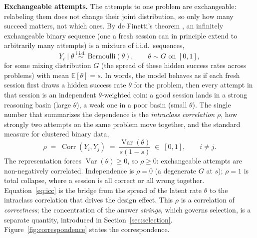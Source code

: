 \documentclass[11pt]{article}
\newcommand{\E}{\mathbb{E}}
\newcommand{\Var}{\operatorname{Var}}
\newcommand{\Corr}{\operatorname{Corr}}
\begin{document}
\textbf{Exchangeable attempts.} The attempts to one problem are exchangeable: relabeling them does not change their joint distribution, so only how many succeed matters, not which ones. By de Finetti's theorem \citep{definetti1937prevision}, an infinitely exchangeable binary sequence (one a fresh session can in principle extend to arbitrarily many attempts) is a mixture of i.i.d.\ sequences,
\begin{equation}
Y_i \mid \theta \;\overset{\text{i.i.d.}}{\sim}\; \text{Bernoulli}(\theta),
\qquad
\theta \sim G \text{ on } [0,1],
\label{eq:definetti}
\end{equation}
for some mixing distribution $G$ (the spread of these hidden success rates across problems) with mean $\E[\theta] = s$. In words, the model behaves as if each fresh session first draws a hidden success rate $\theta$ for the problem, then every attempt in that session is an independent $\theta$-weighted coin: a good session lands in a strong reasoning basin (large $\theta$), a weak one in a poor basin (small $\theta$). The single number that summarizes the dependence is the \emph{intraclass correlation} $\rho$, how strongly two attempts on the same problem move together, and the standard measure for clustered binary data,
\begin{equation}
\rho \;=\; \Corr(Y_i, Y_j) \;=\; \frac{\Var(\theta)}{s(1-s)} \;\in\; [0,1],
\qquad i \ne j .
\label{eq:icc}
\end{equation}
The representation forces $\Var(\theta)\ge0$, so $\rho\ge0$: exchangeable attempts are non-negatively correlated. Independence is $\rho = 0$ (a degenerate $G$ at $s$); $\rho = 1$ is total collapse, where a session is all correct or all wrong together. Equation~\eqref{eq:icc} is the bridge from the spread of the latent rate $\theta$ to the intraclass correlation that drives the design effect. This $\rho$ is a correlation of \emph{correctness}; the concentration of the answer \emph{strings}, which governs selection, is a separate quantity, introduced in Section~\ref{sec:selection}. Figure~\ref{fig:correspondence} states the correspondence.
\end{document}
